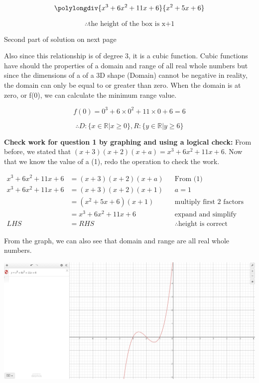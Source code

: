 \documentclass[12pt]{book}
\begin{document}
\begin{enumerate}
$$\polylongdiv{x^3+6x^2+11x+6}{x^2+5x+6}$$

    $$\boxed{\therefore \text{the height of the box is x+1}}$$
    \vspace{1cm}
    \begin{center}
        Second part of solution on next page
    \end{center}
    \newpage

    Also since this relationship is of degree 3, it is a cubic function. Cubic functions have should 
    the properties of a domain and range of all real whole numbers but since the dimensions of a 
    of a 3D shape (Domain) cannot be negative in reality, the domain can only be 
    equal to or greater than zero. When the domain is at zero, or f(0), we can calculate the 
    minimum range value. 

    $$f(0) = 0^3+6\times 0^2+11\times 0+6 = 6$$
   
    $$\boxed{\therefore D: \{ x \in \mathbb{R} | x \geq 0 \} , R: \{ y \in \mathbb{R} | y \geq 6 \}}$$

\vspace{1cm}
\textbf{Check work for question 1 by graphing and using a logical check:}
\vspace{1em}
From before, we stated that $(x+3)(x+2)(x+a) = x^3+6x^2+11x+6$. Now that we know the value of a (1), redo the operation to check the work.

\begin{align*}
    x^3+6x^2+11x+6 &= (x+3)(x+2)(x+a)&& \text{From (1)}\\
    x^3+6x^2+11x+6 &= (x+3)(x+2)(x+1) && a = 1\\
    &= (x^2+5x+6)(x+1) && \text{multiply first 2 factors and simplify} \\
    &= x^3+6x^2+11x+6 && \text{expand and simplify}\\
    LHS &= RHS && \therefore \text{height is correct}
\end{align*}

\vspace{1em}
From the graph, we can also see that domain and range are all real whole numbers.

\vspace{1.5em}
\includegraphics[width=\linewidth]{a2-1 graph.PNG}


\end{enumerate}
\end{document}
